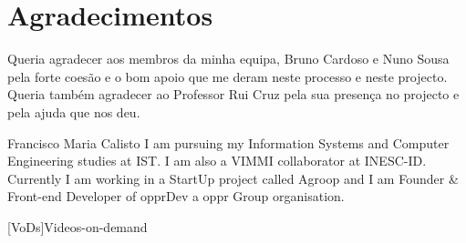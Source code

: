 \documentclass[a4paper,12pt,journal,twoside,compsoc]{PPIEEEtran}
\begin{document}
\section{Agradecimentos}

Queria agradecer aos membros da minha equipa, Bruno Cardoso e Nuno Sousa pela forte coesão e o bom apoio que me deram neste processo e neste projecto. Queria também agradecer ao Professor Rui Cruz pela sua presença no projecto e pela ajuda que nos deu.

% 
\begin{IEEEbiography}
{Francisco Maria Calisto}
I am pursuing my Information Systems and Computer  Engineering studies at \ac{IST}. I am also a \ac{VIMMI} collaborator at \ac{INESC-ID}. Currently I am working in a StartUp project called Agroop and I am Founder \& Front-end Developer of opprDev a oppr Group organisation.
\end{IEEEbiography}
\newpage
\onecolumn

	[VoDs]{Videos-on-demand}
	
\end{document}
